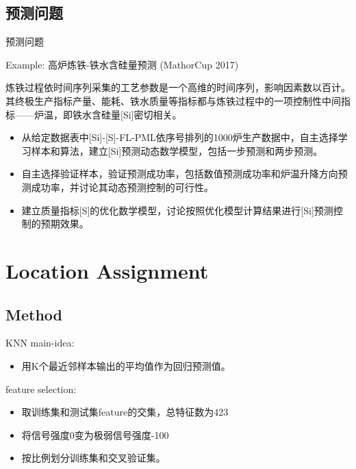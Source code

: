 \documentclass[aspectratio=43]{beamer}
\begin{document}
\subsection{预测问题}
\begin{frame}{预测问题}
\begin{block}{Example: 高炉炼铁-铁水含硅量预测 (MathorCup 2017)}
\end{block}
\vspace{0.3cm}
炼铁过程依时间序列采集的工艺参数是一个高维的时间序列，影响因素数以百计。其终极生产指标产量、能耗、铁水质量等指标都与炼铁过程中的一项控制性中间指标——炉温，即铁水含硅量[Si]密切相关。
\begin{itemize}
  \item 从给定数据表中[Si]-[S]-FL-PML依序号排列的1000炉生产数据中，自主选择学习样本和算法，建立[Si]预测动态数学模型，包括一步预测和两步预测。
  \item 自主选择验证样本，验证预测成功率，包括数值预测成功率和炉温升降方向预测成功率，并讨论其动态预测控制的可行性。
  \item 建立质量指标[S]的优化数学模型，讨论按照优化模型计算结果进行[Si]预测控制的预期效果。
\end{itemize}
\end{frame}


\section{Location Assignment}
\subsection{Method}
\begin{frame}{KNN}
main-idea:
\begin{itemize}
  \item 用K个最近邻样本输出的平均值作为回归预测值。
\end{itemize}
\vspace{1cm}
feature selection:
\begin{itemize}
  \item 取训练集和测试集feature的交集，总特征数为423
  \item 将信号强度0变为极弱信号强度-100
  \item 按比例划分训练集和交叉验证集。
\end{itemize}
\end{frame}
\end{document}
